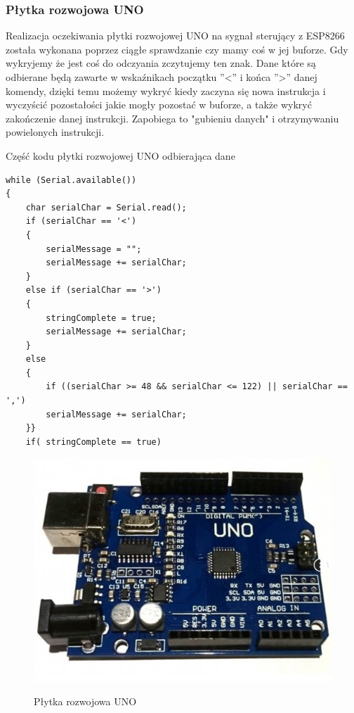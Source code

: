 \documentclass[12pt]{article}
\begin{document}
\subsubsection{Płytka rozwojowa UNO}
Realizacja oczekiwania płytki rozwojowej UNO na sygnał sterujący z ESP8266 została wykonana poprzez ciągłe sprawdzanie czy mamy coś w jej buforze. Gdy wykryjemy że jest coś do odczyania zczytujemy ten znak. Dane które są odbierane będą zawarte w wskaźnikach początku ''<'' i końca ''>'' danej komendy, dzięki temu możemy wykryć kiedy zaczyna się nowa instrukcja i wyczyścić pozostałości jakie mogły pozostać w buforze, a także wykryć zakończenie danej instrukcji. Zapobiega to "gubieniu danych" i otrzymywaniu powielonych instrukcji.
\begin{spverbatim}
	Część kodu płytki rozwojowej UNO odbierająca dane
\end{spverbatim}
\begin{lstlisting}
while (Serial.available()) 
{
	char serialChar = Serial.read(); 
	if (serialChar == '<')  
	{
		serialMessage = "";
		serialMessage += serialChar;
	}
	else if (serialChar == '>')
	{
		stringComplete = true;
		serialMessage += serialChar;
	}
	else
	{ 
		if ((serialChar >= 48 && serialChar <= 122) || serialChar == ',') 
		serialMessage += serialChar;
	}}
	if( stringComplete == true)
\end{lstlisting}


\begin{figure}[!h]
	\begin{center}
		{\includegraphics[width=12cm]{uno_photo.png}}
	\end{center}
	\caption{Płytka rozwojowa UNO}
\end{figure}
\end{document}
